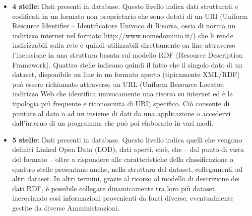 \documentclass{article}
\theoremstyle{plain}
\theoremstyle{definition}
\begin{document}
\begin{itemize}
\item \textbf{4 stelle:} Dati presenti in database. Questo livello indica dati strutturati e codificati in un formato non proprietario che sono dotati di un URI (Uniform Resource Identifier – Identificatore Univoco di Risorsa, ossia di norma un indirizzo internet nel formato http://www.nomedominio.it/) che li rende indirizzabili sulla rete e quindi utilizzabili direttamente on line attraverso l'inclusione in una struttura basata sul modello RDF (Resource Description Framework). Quattro stelle indicano quindi il fatto che il singolo dato di un dataset, disponibile on line in un formato aperto (tipicamente XML/RDF) può essere richiamato attraverso un URL (Uniform Resource Locator, indirizzo Web che identifica univocamente una risorsa su internet ed è la tipologia più frequente e riconosciuta di URI) specifico. Ciò consente di puntare al dato o ad un insieme di dati da una applicazione o accedervi dall'interno di un programma che può poi elaborarlo in vari modi.

\item \textbf{5 stelle:} Dati presenti in database. Questo livello indica quelli che vengono definiti Linked Open Data (LOD), dati aperti, cioè, che – dal punto di vista del formato – oltre a rispondere alle caratteristiche della classificazione a quattro stelle presentano anche, nella struttura del dataset, collegamenti ad altri dataset. In altri termini, grazie al ricorso al modello di descrizione dei dati RDF, è possibile collegare dinamicamente tra loro più dataset, incrociando così informazioni provenienti da fonti diverse, eventualmente gestite da diverse Amministrazioni.
\end{itemize}
\phantom
\\

\newpage
\end{document}

